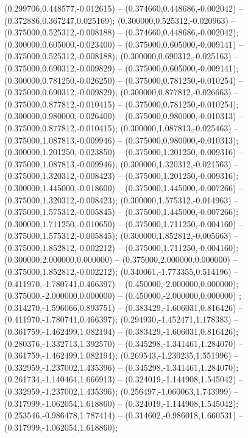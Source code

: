  (0.299706,0.448577,-0.012615) -- (0.374660,0.448686,-0.002042) -- (0.372886,0.367247,0.025169);
 (0.300000,0.525312,-0.020963) -- (0.375000,0.525312,-0.008188) -- (0.374660,0.448686,-0.002042);
 (0.300000,0.605000,-0.023400) -- (0.375000,0.605000,-0.009141) -- (0.375000,0.525312,-0.008188);
 (0.300000,0.690312,-0.025163) -- (0.375000,0.690312,-0.009829) -- (0.375000,0.605000,-0.009141);
 (0.300000,0.781250,-0.026250) -- (0.375000,0.781250,-0.010254) -- (0.375000,0.690312,-0.009829);
 (0.300000,0.877812,-0.026663) -- (0.375000,0.877812,-0.010415) -- (0.375000,0.781250,-0.010254);
 (0.300000,0.980000,-0.026400) -- (0.375000,0.980000,-0.010313) -- (0.375000,0.877812,-0.010415);
 (0.300000,1.087813,-0.025463) -- (0.375000,1.087813,-0.009946) -- (0.375000,0.980000,-0.010313);
 (0.300000,1.201250,-0.023850) -- (0.375000,1.201250,-0.009316) -- (0.375000,1.087813,-0.009946);
 (0.300000,1.320312,-0.021563) -- (0.375000,1.320312,-0.008423) -- (0.375000,1.201250,-0.009316);
 (0.300000,1.445000,-0.018600) -- (0.375000,1.445000,-0.007266) -- (0.375000,1.320312,-0.008423);
 (0.300000,1.575312,-0.014963) -- (0.375000,1.575312,-0.005845) -- (0.375000,1.445000,-0.007266);
 (0.300000,1.711250,-0.010650) -- (0.375000,1.711250,-0.004160) -- (0.375000,1.575312,-0.005845);
 (0.300000,1.852812,-0.005663) -- (0.375000,1.852812,-0.002212) -- (0.375000,1.711250,-0.004160);
 (0.300000,2.000000,0.000000) -- (0.375000,2.000000,0.000000) -- (0.375000,1.852812,-0.002212);
 (0.340061,-1.773355,0.514196) -- (0.411970,-1.780741,0.466397) -- (0.450000,-2.000000,0.000000);
 (0.375000,-2.000000,0.000000) -- (0.450000,-2.000000,0.000000) ;
 (0.314270,-1.596066,0.893751) -- (0.383429,-1.606031,0.816426) -- (0.411970,-1.780741,0.466397);
 (0.294930,-1.452471,1.178383) -- (0.361759,-1.462499,1.082194) -- (0.383429,-1.606031,0.816426);
 (0.280376,-1.332713,1.392570) -- (0.345298,-1.341461,1.284070) -- (0.361759,-1.462499,1.082194);
 (0.269543,-1.230235,1.551996) -- (0.332959,-1.237002,1.435396) -- (0.345298,-1.341461,1.284070);
 (0.261734,-1.140464,1.666913) -- (0.324019,-1.144908,1.545042) -- (0.332959,-1.237002,1.435396);
 (0.256497,-1.060063,1.743999) -- (0.317999,-1.062054,1.618860) -- (0.324019,-1.144908,1.545042);
 (0.253546,-0.986478,1.787414) -- (0.314602,-0.986018,1.660531) -- (0.317999,-1.062054,1.618860);
